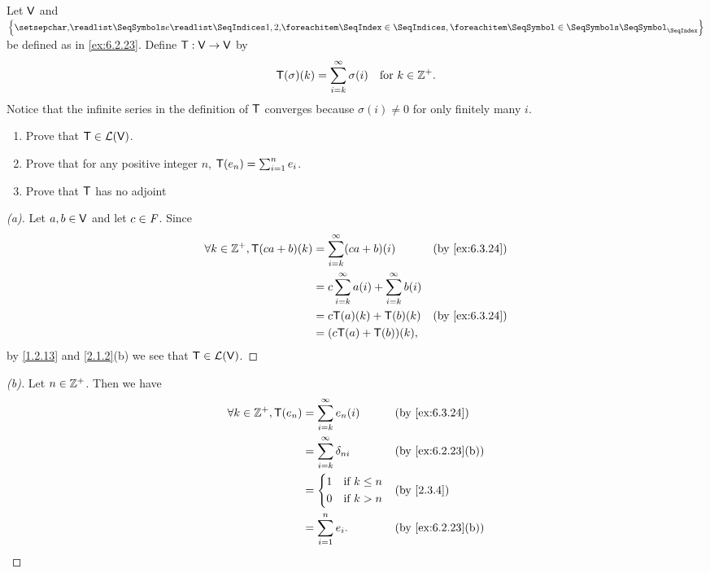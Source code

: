 \begin{ex}\label{ex:6.3.24}
  Let \(\mathsf{V}\) and \(\set{\seq{e}{1,2,}}\) be defined as in \cref{ex:6.2.23}.
  Define \(\mathsf{T} : \mathsf{V} \to \mathsf{V}\) by
  \[
    \mathsf{T}(\sigma)(k) = \sum_{i = k}^\infty \sigma(i) \quad \text{for } k \in \mathbb{Z}^+.
  \]
  Notice that the infinite series in the definition of \(\mathsf{T}\) converges because \(\sigma(i) \neq 0\) for only finitely many \(i\).
  \begin{enumerate}
    \item Prove that \(\mathsf{T} \in \mathcal{L}(\mathsf{V})\).
    \item Prove that for any positive integer \(n\), \(\mathsf{T}(e_n) = \sum_{i = 1}^n e_i\).
    \item Prove that \(\mathsf{T}\) has no adjoint
  \end{enumerate}
\end{ex}

\begin{proof}[(a)]
  Let \(a, b \in \mathsf{V}\) and let \(c \in \mathit{F}\).
  Since
  \begin{align*}
    \forall k \in \Z^+, \T(ca + b)(k) & = \sum_{i = k}^\infty (ca + b)(i)                       &  & \text{(by \cref{ex:6.3.24})} \\
                                      & = c \sum_{i = k}^\infty a(i) + \sum_{i = k}^\infty b(i)                                   \\
                                      & = c \T(a)(k) + \T(b)(k)                                 &  & \text{(by \cref{ex:6.3.24})} \\
                                      & = (c \T(a) + \T(b))(k),
  \end{align*}
  by \cref{1.2.13} and \cref{2.1.2}(b) we see that \(\mathsf{T} \in \mathcal{L}(\mathsf{V})\).
\end{proof}

\begin{proof}[(b)]
  Let \(n \in \mathbb{Z}^+\).
  Then we have
  \begin{align*}
    \forall k \in \Z^+, \T(e_n) & = \sum_{i = k}^\infty e_n(i)       &  & \text{(by \cref{ex:6.3.24})}    \\
                                & = \sum_{i = k}^\infty \delta_{n i} &  & \text{(by \cref{ex:6.2.23}(b))} \\
                                & = \begin{dcases}
                                      1 & \text{if } k \leq n \\
                                      0 & \text{if } k > n
                                    \end{dcases}         &  & \text{(by \cref{2.3.4})}                    \\
                                & = \sum_{i = 1}^n e_i.              &  & \text{(by \cref{ex:6.2.23}(b))}
  \end{align*}
\end{proof}

